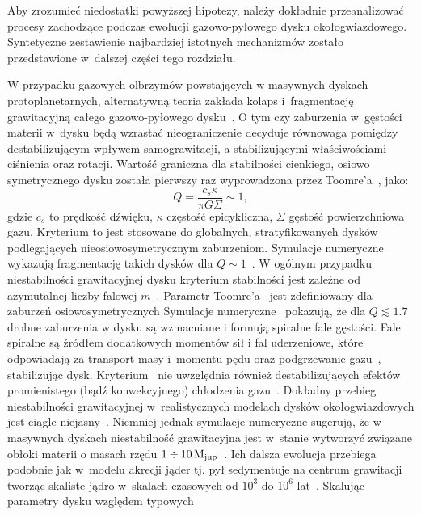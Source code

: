 \par Aby zrozumieć niedostatki powyższej hipotezy, należy
dokładnie przeanalizować procesy zachodzące podczas ewolucji gazowo-pyłowego
dysku okołogwiazdowego. Syntetyczne zestawienie najbardziej istotnych
mechanizmów zostało przedstawione w~dalszej części tego rozdziału.

\par W przypadku gazowych olbrzymów powstających w masywnych dyskach
protoplanetarnych, alternatywną teoria zakłada kolaps i~fragmentację
grawitacyjną całego gazowo-pyłowego dysku~\cite{Boss97}. O tym czy zaburzenia
w~gęstości materii w~dysku będą wzrastać nieograniczenie decyduje równowaga
pomiędzy destabilizującym wpływem samograwitacji, a stabilizującymi
właściwościami ciśnienia oraz rotacji.  Wartość graniczna dla stabilności
cienkiego, osiowo symetrycznego dysku została pierwszy raz wyprowadzona przez
Toomre'a~\cite{T64}, jako:
%
\begin{equation}
   Q = \frac{c_s\kappa}{\pi G \Sigma}\sim 1,
   \label{eq:toomre}
\end{equation}
%
gdzie $c_s$ to prędkość dźwięku, $\kappa$ częstość epicykliczna, $\Sigma$
gęstość powierzchniowa gazu. Kryterium to jest stosowane do globalnych,
stratyfikowanych dysków podlegających nieosiowosymetrycznym zaburzeniom.
Symulacje numeryczne wykazują fragmentację takich dysków dla $Q\sim
1$~\cite{NBAA98}. W ogólnym przypadku niestabilności grawitacyjnej dysku
kryterium stabilności jest zależne od azymutalnej liczby falowej
$m$~\cite{BT87}. Parametr Toomre'a~ jest zdefiniowany dla
zaburzeń osiowosymetrycznych
Symulacje numeryczne~\cite{Duris07} pokazują, że dla $Q\lesssim 1.7$ drobne
zaburzenia w dysku są wzmacniane i formują spiralne fale gęstości. 
Fale spiralne są źródłem dodatkowych momentów sił i fal
uderzeniowe, które odpowiadają za transport masy i~momentu pędu oraz
podgrzewanie gazu~\cite{YC85}, stabilizując dysk. Kryterium~ nie
uwzględnia również destabilizujących efektów promienistego (bądź konwekcyjnego)
chłodzenia gazu~\cite{BMD06}. Dokładny przebieg niestabilności grawitacyjnej
w~realistycznych modelach dysków okołogwiazdowych jest ciągle
niejasny~\cite{MB11, LC11}. Niemniej jednak symulacje numeryczne sugerują, że w
masywnych dyskach niestabilność grawitacyjna jest w~stanie wytworzyć związane
obłoki materii o masach rzędu $1\div 10\hbox{$\mathrm{\thinspace M_{\textrm{jup}}}$}$~\cite{BHM10, FR11}. Ich dalsza
ewolucja przebiega podobnie jak w~modelu akrecji jąder tj. pył sedymentuje na
centrum grawitacji tworząc skaliste jądro w~skalach czasowych od $10^3$ do
$10^6$ lat~\cite{HB11, GHB12}. Skalując parametry dysku względem typowych
